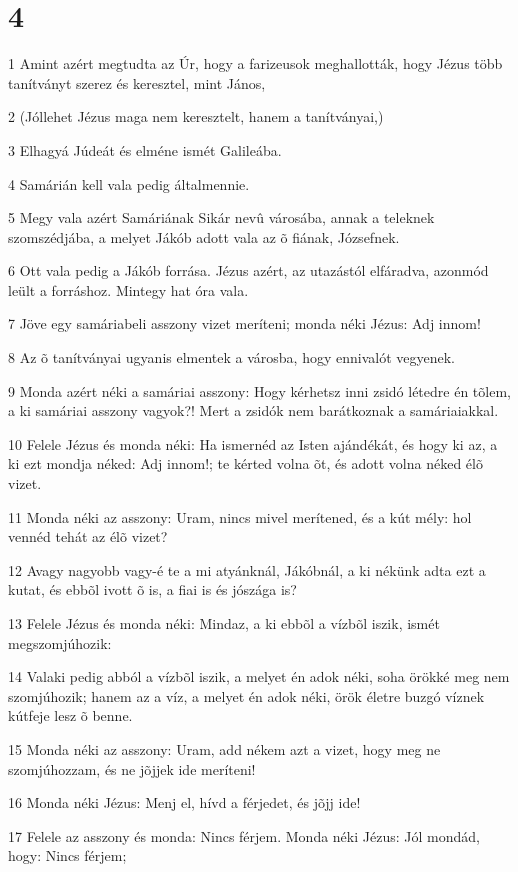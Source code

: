 \chapter{4}

\par 1 Amint azért megtudta az Úr, hogy a farizeusok meghallották, hogy Jézus több tanítványt szerez és keresztel, mint János,
\par 2 (Jóllehet Jézus maga nem keresztelt, hanem a tanítványai,)
\par 3 Elhagyá Júdeát és elméne ismét Galileába.
\par 4 Samárián kell vala pedig általmennie.
\par 5 Megy vala azért Samáriának Sikár nevû városába, annak a teleknek szomszédjába, a melyet Jákób adott vala az õ fiának, Józsefnek.
\par 6 Ott vala pedig a Jákób forrása. Jézus azért, az utazástól elfáradva, azonmód leült a forráshoz. Mintegy hat óra vala.
\par 7 Jöve egy samáriabeli asszony vizet meríteni; monda néki Jézus: Adj innom!
\par 8 Az õ tanítványai ugyanis elmentek a városba, hogy ennivalót vegyenek.
\par 9 Monda azért néki a samáriai asszony: Hogy kérhetsz inni zsidó létedre én tõlem, a ki samáriai asszony vagyok?! Mert a zsidók nem barátkoznak a samáriaiakkal.
\par 10 Felele Jézus és monda néki: Ha ismernéd az Isten ajándékát, és hogy ki az, a ki ezt mondja néked: Adj innom!; te kérted volna õt, és adott volna néked élõ vizet.
\par 11 Monda néki az asszony: Uram, nincs mivel merítened, és a kút mély: hol vennéd tehát az élõ vizet?
\par 12 Avagy nagyobb vagy-é te a mi atyánknál, Jákóbnál, a ki nékünk adta ezt a kutat, és ebbõl ivott õ is, a fiai is és jószága is?
\par 13 Felele Jézus és monda néki: Mindaz, a ki ebbõl a vízbõl iszik, ismét megszomjúhozik:
\par 14 Valaki pedig abból a vízbõl iszik, a melyet én adok néki, soha örökké meg nem szomjúhozik; hanem az a víz, a melyet én adok néki, örök életre buzgó víznek  kútfeje lesz õ benne.
\par 15 Monda néki az asszony: Uram, add nékem azt a vizet, hogy meg ne szomjúhozzam, és ne jõjjek ide meríteni!
\par 16 Monda néki Jézus: Menj el, hívd a férjedet, és jõjj ide!
\par 17 Felele az asszony és monda: Nincs férjem. Monda néki Jézus: Jól mondád, hogy: Nincs férjem;

